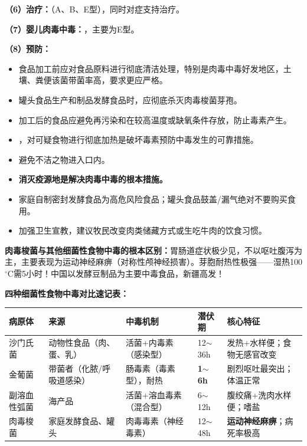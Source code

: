 \begin{keybox}
\textbf{（6）治疗：}（A、B、E型），同时对症支持治疗。

\textbf{（7）婴儿肉毒中毒：}，主要为E型。

\textbf{（8）预防：}
\begin{itemize}[leftmargin=*]
    \item 食品加工前应对食品原料进行彻底清洁处理，特别是肉毒中毒好发地区，土壤、粪便该菌带菌率高，要求更应严格。
    \item 罐头食品生产和制品发酵食品时，应彻底杀灭肉毒梭菌芽孢。
    \item 加工后的食品应避免再污染和在较高温度或缺氧条件存放，防止毒素产生。
    \item {}，对可疑食物进行彻底加热是破坏毒素预防中毒发生的可靠措施。
    \item 避免不洁之物进入口内。
    \item \textbf{消灭疫源地是解决肉毒中毒的根本措施。}
    \item 家庭自制密封发酵食品为高危风险食品；罐头食品鼓盖/漏气绝对不要购买食用。
    \item 加强卫生宣教，建议牧民改变肉类储藏方式或生吃牛肉的饮食习惯。
\end{itemize}
\end{keybox}

\begin{exambox}
\textbf{肉毒梭菌与其他细菌性食物中毒的根本区别：}胃肠道症状极少见，不以呕吐腹泻为主，主要表现为运动神经麻痹（对称性颅神经损害）。芽胞耐热性极强——湿热100$^\circ$C需5小时！中国以发酵豆制品为主要中毒食品，新疆高发！
\end{exambox}

\begin{tipbox}
\textbf{四种细菌性食物中毒对比速记表：}

\bgroup
\renewcommand{\arraystretch}{1.3}
\begin{tabularx}{\textwidth}{lXXXX}
\toprule
\textbf{病原体} & \textbf{来源} & \textbf{中毒机制} & \textbf{潜伏期} & \textbf{核心特征} \\
\midrule
沙门氏菌 & 动物性食品（肉、蛋、乳） & 活菌+内毒素（感染型） & 12$\sim$36h & 发热+水样便；食物无感官改变 \\
\addlinespace
金葡菌 & 带菌者（化脓/呼吸道感染） & 肠毒素（毒素型），耐热 & \textbf{1$\sim$6h} & 剧烈呕吐最突出；体温正常 \\
\addlinespace
副溶血性弧菌 & 海产品 & 活菌+溶血毒素（混合型） & 6$\sim$12h & 腹绞痛+洗肉水样便；嗜盐 \\
\addlinespace
肉毒梭菌 & 家庭发酵食品、罐头 & 肉毒毒素（神经毒素） & 12$\sim$48h & \textbf{运动神经麻痹}；病死率极高 \\
\bottomrule
\end{tabularx}
\egroup
\end{tipbox}

